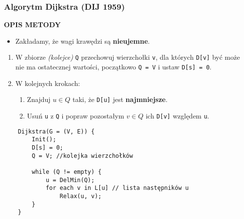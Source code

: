 \documentclass[algorytmy.tex]{subfiles}
\begin{document}
    \pagebreak

    \subsubsection{Algorytm Dijkstra (DIJ 1959)}

    \textbf{OPIS METODY}
    \begin{itemize}
        \item Zakładamy, że wagi krawędzi są \textbf{nieujemne}.
    \end{itemize}
    \begin{enumerate}
        \item W zbiorze \textit{(kolejce)} \texttt{Q} przechowuj wierzchołki
            \texttt{v}, dla których \texttt{D[v]} być może nie ma ostatecznej
            wartości, początkowo \texttt{Q = V} i ustaw \texttt{D[s] = 0}.
        \item W kolejnych krokach:
            \begin{enumerate}
                \item Znajduj $u \in Q$ taki, że \texttt{D[u]} jest
                    \textbf{najmniejsze}.

                \item Usuń \texttt{u} z \texttt{Q} i popraw pozostałym $v \in Q$
                    ich \texttt{D[v]} względem \texttt{u}.
            \end{enumerate}
    \end{enumerate}

    \begin{verbatim}
    Dijkstra(G = (V, E)) {
        Init();
        D[s] = 0;
        Q = V; //kolejka wierzchołków

        while (Q != empty) {
            u = DelMin(Q);
            for each v in L[u] // lista następników u
                Relax(u, v);
        }
    }
    \end{verbatim}
\end{document}
